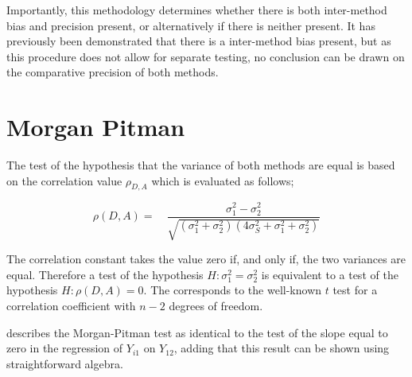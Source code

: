 \documentclass[12pt, a4paper]{report}
\theoremstyle{plain}
\theoremstyle{definition}
\theoremstyle{remark}
\begin{document}
	Importantly, this methodology determines whether there is both
	inter-method bias and precision present, or alternatively if there
	is neither present. It has previously been demonstrated that there
	is a inter-method bias present, but as this procedure does not
	allow for separate testing, no conclusion can be drawn on the
	comparative precision of both methods.
	
	
	
	
	
	
	
	
	
	
	
	\section{Morgan Pitman}
	
	The test of the hypothesis that the variance of both methods are
	equal is based on the correlation value $\rho_{D,A}$ which is
	evaluated as follows;
	
	\begin{equation}
		\rho(D,A)=\quad\frac{\sigma^{2}_{1}-\sigma^{2}_{2}}{\sqrt{(\sigma^{2}_{1}+\sigma^{2}_{2})(4\sigma^{2}_{S}+\sigma^{2}_{1}+\sigma^{2}_{2})}}
	\end{equation}
	
	The correlation constant takes the value zero if, and only if, the
	two variances are equal. Therefore a test of the hypothesis $H:
	\sigma^{2}_{1}=\sigma^{2}_{2}$ is equivalent to a test of the
	hypothesis $H: \rho(D,A) = 0$. The corresponds to the well-known
	$t$ test for a correlation coefficient with $n-2$ degrees of
	freedom.
	
	\citet{Bartko} describes the Morgan-Pitman test as identical to
	the test of the slope equal to zero in the regression of $Y_{i1}$
	on $Y_{12}$, adding that this result can be shown using
	straightforward algebra.
	
\end{document}
